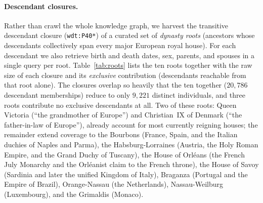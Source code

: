 \paragraph{Descendant closures.}
Rather than crawl the whole knowledge graph, we harvest the transitive descendant
closure (\texttt{wdt:P40*}) of a curated set of \emph{dynasty roots} (ancestors
whose descendants collectively span every major European royal house). For each
descendant we also retrieve birth and death dates, sex, parents, and spouses in a
single query per root. Table~\ref{tab:roots} lists the ten roots together with the
raw size of each closure and its \emph{exclusive} contribution (descendants
reachable from that root alone). The closures overlap so heavily that the ten
together ($20{,}786$ descendant memberships) reduce to only $9{,}221$ distinct
individuals, and three roots contribute no exclusive descendants at all. Two of
these roots: Queen Victoria (``the grandmother of Europe'') and Christian~IX of
Denmark (``the father-in-law of Europe''), already account for most currently
reigning houses; the remainder extend coverage to the Bourbons (France, Spain, and
the Italian duchies of Naples and Parma), the Habsburg-Lorraines (Austria, the Holy
Roman Empire, and the Grand Duchy of Tuscany), the House of Orl\'eans (the French
July Monarchy and the Orl\'eanist claim to the French throne), the House of Savoy
(Sardinia and later the unified Kingdom of Italy), Braganza (Portugal and the
Empire of Brazil), Orange-Nassau (the Netherlands), Nassau-Weilburg (Luxembourg),
and the Grimaldis (Monaco).

